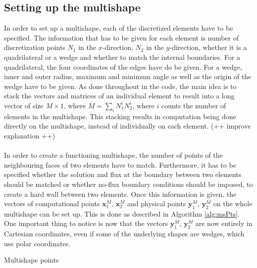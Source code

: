\documentclass[11pt, a4paper]{article}
\theoremstyle{definition}
\begin{document}
\subsection{Setting up the multishape}
In order to set up a multishape, each of the discretized elements have to be specified. The information that has to be given for each element is number of discretization points $N_1$ in the $x$-direction, $N_2$ in the $y$-direction, whether it is a quadrilateral or a wedge and whether to match the internal boundaries. For a quadrilateral, the four coordinates of the edges have do be given. For a wedge, inner and outer radius, maximum and minimum angle as well as the origin of the wedge have to be given. 
As done throughout in the code, the main idea is to stack the vectors and matrices of an individual element to result into a long vector of size $M \times 1$, where $M = \sum_i N^i_1 N^i_2$, where $i$ counts the number of elements in the multishape. This stacking results in computation being done directly on the multishape, instead of individually on each element. (++ improve explanation ++)
\\
\\
In order to create a functioning multishape, the number of points of the neighbouring faces of two elements have to match. Furthermore, it has to be specified whether the solution and flux at the boundary between two elements should be matched or whether no-flux boundary conditions should be imposed, to create a hard wall between two elements.
Once this information is given, the vectors of computational points $\mathbf x_1^M$, $\mathbf x_2^M$ and physical points $\mathbf y_1^M$, $\mathbf y_2^M$ on the whole multishape can be set up. This is done as described in Algorithm \ref{alg:msPts}.
 One important thing to notice is now that the vectors $\mathbf y_1^M$, $\mathbf y_2^M$ are now entirely in Cartesian coordinates, even if some of the underlying shapes are wedges, which use polar coordinates.

\begin{algorithm}[H]	\label{alg:msPts}
	\SetAlgoLined
\caption{Multishape points}
\end{algorithm}
\end{document}
